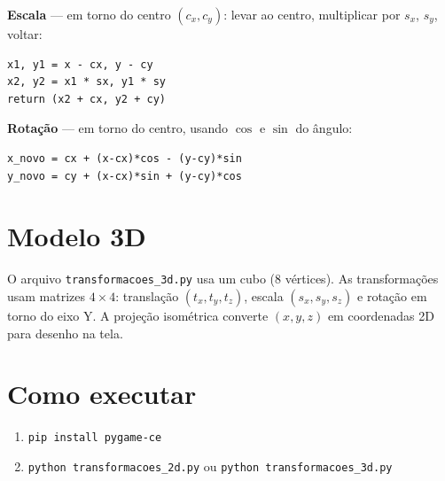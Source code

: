 \documentclass[12pt,a4paper]{article}
\begin{document}
\textbf{Escala} — em torno do centro $(c_x, c_y)$: levar ao centro, multiplicar por $s_x$, $s_y$, voltar:
\begin{lstlisting}
x1, y1 = x - cx, y - cy
x2, y2 = x1 * sx, y1 * sy
return (x2 + cx, y2 + cy)
\end{lstlisting}

\textbf{Rotação} — em torno do centro, usando $\cos$ e $\sin$ do ângulo:
\begin{lstlisting}
x_novo = cx + (x-cx)*cos - (y-cy)*sin
y_novo = cy + (x-cx)*sin + (y-cy)*cos
\end{lstlisting}

\section{Modelo 3D}
O arquivo \texttt{transformacoes\_3d.py} usa um cubo (8 vértices). As transformações usam matrizes $4 \times 4$: translação $(t_x, t_y, t_z)$, escala $(s_x, s_y, s_z)$ e rotação em torno do eixo Y. A projeção isométrica converte $(x,y,z)$ em coordenadas 2D para desenho na tela.

\section{Como executar}
\begin{enumerate}
    \item \texttt{pip install pygame-ce}
    \item \texttt{python transformacoes\_2d.py} ou \texttt{python transformacoes\_3d.py}
\end{enumerate}
\end{document}
